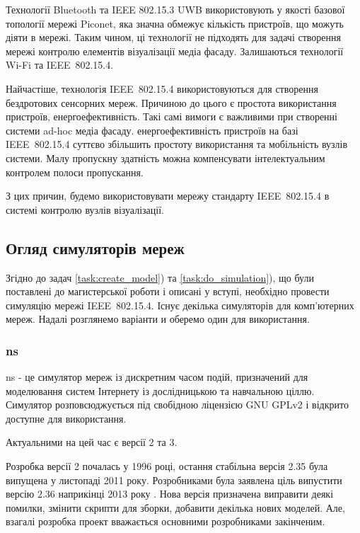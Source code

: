 \documentclass[a4paper,ukrainian,utf8,nocolumnsxix,floatsection,equationsection]{eskdtext}
\renewcommand\paragraph{\subsubsection}
\newcommand{\todoi}[1]{\todo[inline]{#1}}
\newcommand{\iee}[0]{IEEE~802.15.4\xspace}
\begin{document}

Технології Bluetooth та IEEE 802.15.3 UWB використовують у якості базової топології мережі Piconet, яка значна обмежує кількість пристроїв, що можуть діяти в мережі. Таким чином, ці технології не підходять для задачі створення мережі контролю елементів візуалізації медіа фасаду. Залишаються технології Wi-Fi та \iee. 

Найчастіше, технологія \iee використовуються для створення бездротових сенсорних мереж. Причиною до цього є простота використання пристроїв, енергоефективність. Такі самі вимоги є важливими при створенні системи ad-hoc медіа фасаду. енергоефективність пристроїв на базі \iee суттєво збільшить простоту використання та мобільність вузлів системи. Малу пропускну здатність можна компенсувати інтелектуальним контролем полоси пропускання.

З цих причин, будемо використовувати мережу стандарту \iee в системі контролю вузлів візуалізації.




\subsection{Огляд симуляторів мереж}

Згідно до задач \ref{task:create_model}) та \ref{task:do_simulation}), що були поставлені до магистерської роботи і описані у вступі, необхідно провести симуляцію мережі \iee. Існує декілька симуляторів для комп'ютерних мереж. Надалі розглянемо варіанти и оберемо один для використання.

\paragraph{ns}
\label{par:ns}

ns - це симулятор мереж із дискретним часом подій, призначений для моделювання систем Інтернету із дослідницькою та навчальною ціллю. Симулятор розповсюджується під свобідною ліцензією GNU GPLv2 і відкрито доступне для використання.

Актуальними на цей час є версії 2 та 3. 

Розробка версії 2 почалась у 1996 році, остання стабільна версія 2.35 була випущена у листопаді 2011 року. Розробниками була заявлена ціль випустити версію 2.36 наприкінці 2013 року \cite{nsnam:roadmap}. Нова версія призначена виправити деякі помилки, змінити скрипти для зборки, добавити декілька нових моделей. Але, взагалі розробка проект вважається основними розробниками закінченим.
\end{document}
